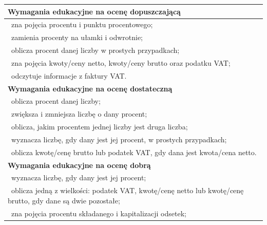 \documentclass[12pt,a4paper]{article}
\begin{document}
	\begin{longtable}{|p{16cm}|}
		\hline
		
		\textbf{Wymagania edukacyjne na ocenę dopuszczającą} \\ \hline
		
		\textbullet\ zna pojęcia procentu i punktu procentowego; \\
		
		\textbullet\ zamienia procenty na ułamki i odwrotnie; \\
		
		\textbullet\ oblicza procent danej liczby w prostych przypadkach; \\
		
		\textbullet\ zna pojęcia kwoty/ceny netto, kwoty/ceny brutto oraz podatku VAT; \\
		
		\textbullet\ odczytuje informacje z faktury VAT. \\ \hline
		
		\textbf{Wymagania edukacyjne na ocenę dostateczną} \\ \hline
		
		\textbullet\ oblicza procent danej liczby; \\
		
		\textbullet\ zwiększa i zmniejsza liczbę o dany procent; \\
		
		\textbullet\ oblicza, jakim procentem jednej liczby jest druga liczba; \\
		
		\textbullet\ wyznacza liczbę, gdy dany jest jej procent, w prostych przypadkach; \\
		
		\textbullet\ oblicza kwotę/cenę brutto lub podatek VAT, gdy dana jest kwota/cena netto. \\ \hline
		
		\textbf{Wymagania edukacyjne na ocenę dobrą} \\ \hline
		
		\textbullet\ wyznacza liczbę, gdy dany jest jej procent; \\
		
		\textbullet\ oblicza jedną z wielkości: podatek VAT, kwotę/cenę netto lub kwotę/cenę brutto, gdy dane są dwie pozostałe; \\
		
		\textbullet\ zna pojęcia procentu składanego i kapitalizacji odsetek; \\
		

\end{longtable}
\end{document}
